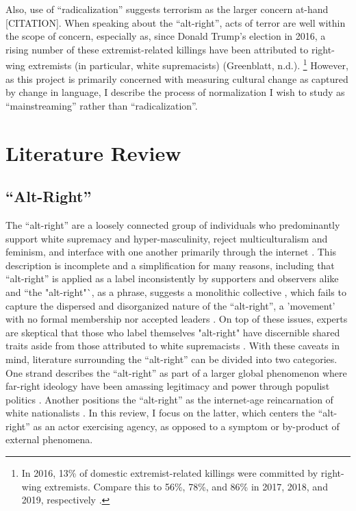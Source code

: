 \documentclass[acmlarge, screen, authorversion]{acmart}
\begin{document}
Also, use of “radicalization” suggests terrorism as the larger
concern at-hand [CITATION]. When speaking about the “alt-right”, acts of
terror are well within the scope of concern, especially as, since Donald
Trump’s election in 2016, a rising number of these extremist-related
killings have been attributed to right-wing extremists (in particular,
white supremacists) (Greenblatt, n.d.). \footnote{In 2016, 13\% of domestic extremist-related
	killings were committed by right-wing extremists. Compare this to 56\%,
	78\%, and 86\% in 2017, 2018, and 2019, respectively \cite{greenblattRightWingExtremistViolence}.
} However, as this project is primarily concerned with
measuring cultural change as captured by change in language, I describe
the process of normalization I wish to study as “mainstreaming” rather
than “radicalization”. 

\section{Literature Review}

\subsection{``Alt-Right''}

The ``alt-right” are a loosely connected group of individuals who predominantly support white supremacy and hyper-masculinity, reject multiculturalism and feminism, and interface with one another primarily through the internet
\cite{sternProudBoysWhite2019, mainRiseAltRight2018, nagleKillAllNormies2017, hawleyMakingSenseAltright2017}.
This description is incomplete and a simplification for
many reasons, including that ``alt-right'' is applied as a label inconsistently
by supporters and observers alike \cite{hawleyMakingSenseAltright2017} and
``the "alt-right"`, as a phrase, suggests a monolithic collective
\cite{massanariRethinkingResearchEthics2018}, which fails to capture the
dispersed and disorganized \cite{martinDissectingTrumpMost2017} nature of the
``alt-right'', a 'movement' with no formal membership nor accepted leaders
\cite{hawleyMakingSenseAltright2017}. On top of these issues, experts are
skeptical that those who label themselves "alt-right" have discernible shared
traits aside from those attributed to white supremacists
\cite{gallaherMainstreamingWhiteSupremacy2020,
johndaniszewskiWritingAltright2016}.  With these caveats in mind, literature
surrounding the ``alt-right” can be divided into two categories. One strand
describes the ``alt-right'' as part
of a larger global phenomenon where far-right ideology have been
amassing legitimacy and power through populist politics
\cite{cammaertsMainstreamingExtremeRightWing2018,
worthMorbidSymptomsGlobal2019}. Another positions the
``alt-right” as the internet-age reincarnation of white nationalists
\cite{hawleyMakingSenseAltright2017, mainRiseAltRight2018}. In this review,
I focus on the latter, which centers the ``alt-right'' as an actor exercising agency, as opposed to a symptom or by-product of external phenomena.
\end{document}
